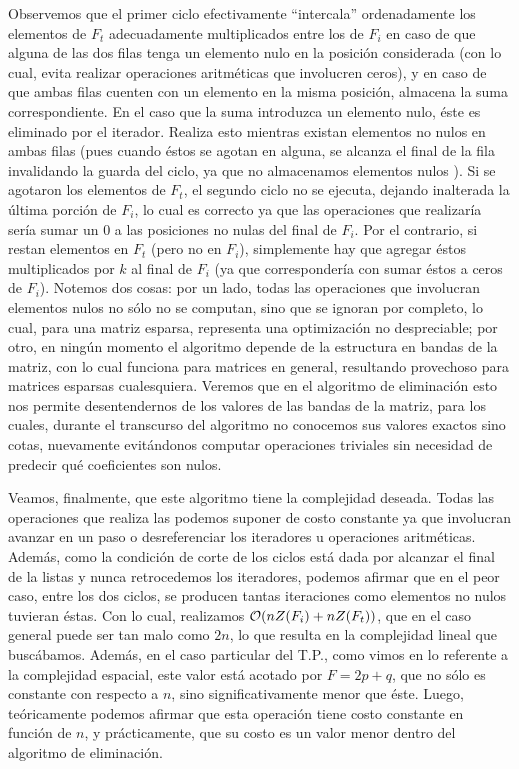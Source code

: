  Observemos que el primer ciclo efectivamente ``intercala'' ordenadamente los elementos de $F_t$ adecuadamente multiplicados entre los de $F_i$ en caso de que alguna de las dos filas tenga un elemento nulo en la posición considerada (con lo cual, evita realizar operaciones aritméticas que involucren ceros), y en caso de que ambas filas cuenten con un elemento en la misma posición, almacena la suma correspondiente. En el caso que la suma introduzca un elemento nulo, éste es eliminado por el iterador. Realiza esto mientras existan elementos no nulos en ambas filas (pues cuando éstos se agotan en alguna, se alcanza el final de la fila invalidando la guarda del ciclo, ya que no almacenamos elementos nulos ). Si se agotaron los elementos de $F_t$, el segundo ciclo no se ejecuta, dejando inalterada la última porción de $F_i$, lo cual es correcto ya que las operaciones que realizaría sería sumar un $0$ a las posiciones no nulas del final de $F_i$. Por el contrario, si restan elementos en $F_t$ (pero no en $F_i$), simplemente hay que agregar éstos multiplicados por $k$ al final de $F_i$ (ya que 
correspondería con sumar éstos a ceros de $F_i$). Notemos dos cosas: por un lado, todas las operaciones que involucran elementos nulos no sólo no se computan, sino que se ignoran por completo, lo cual, para una matriz esparsa, representa una optimización no despreciable; por otro, en ningún momento el algoritmo depende de la estructura en bandas de la matriz, con lo cual funciona para matrices en general, resultando provechoso para matrices esparsas cualesquiera. Veremos que en el algoritmo de eliminación esto nos permite desentendernos de los valores de las bandas de la matriz, para los cuales, durante el transcurso del algoritmo no conocemos sus valores exactos sino cotas, nuevamente evitándonos computar operaciones triviales sin necesidad de predecir qué coeficientes son nulos.
 
 Veamos, finalmente, que este algoritmo tiene la complejidad deseada. Todas las operaciones que realiza las podemos suponer de costo constante ya que involucran avanzar en un paso o desreferenciar los iteradores u operaciones aritméticas. Además, como la condición de corte de los ciclos está dada por alcanzar el final de la listas y nunca retrocedemos los iteradores, podemos afirmar que en el peor caso, entre los dos ciclos, se producen tantas iteraciones como elementos no nulos tuvieran éstas. Con lo cual, realizamos $\mathcal{O}(nZ(F_i) + nZ(F_t))$, que en el caso general puede ser tan malo como $2n$, lo que resulta en la complejidad lineal que buscábamos. Además, en el caso particular del T.P., como vimos en lo referente a la complejidad espacial, este valor está acotado por $F = 2p+q$, que no sólo es constante con respecto a $n$, sino significativamente menor que éste. Luego, teóricamente podemos afirmar que esta operación tiene costo constante en función de $n$, y prácticamente, que su costo es un valor menor 
dentro del algoritmo de eliminación.

